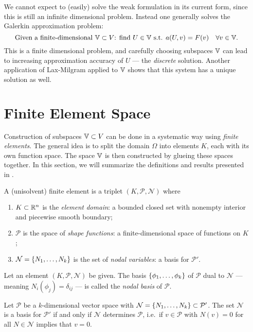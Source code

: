 \documentclass[thesis.tex]{subfiles}
\begin{document}
We cannot expect to (easily) solve the weak formulation in its current form, since this is still an infinite dimensional problem.
Instead one generally solves the Galerkin approximation problem:
\begin{equation}
  \label{eq:galerk_finite}
  \text{Given a finite-dimensional } \mathbb{V} \subset V \text{: find $U \in \mathbb{V}$ s.t. } a(U, v) = F(v) \quad \forall v \in \mathbb{V}.
\end{equation}
This is a finite dimensional problem, and carefully choosing subspaces $\mathbb{V}$ can lead to increasing approximation accuracy of $U$ --- 
the \emph{discrete} solution. Another application of Lax-Milgram applied to $\mathbb{V}$ shows that this system has a unique solution as well.



\section{Finite Element Space}
  \label{sec:deffem}
  Construction of subspaces $\mathbb{V} \subset V$ can be done in a systematic way using \emph{finite elements}. 
  The general idea is to split the domain $\Omega$ into elements $K$, each with its own function space.
  The space $\mathbb{V}$ is then constructed by glueing these spaces together. In this section, we will summarize the definitions and results
  presented in \cite[Ch~3]{brenner}.
  \begin{defn} 
    A (unisolvent) finite element is a triplet $(K, \mathcal{P}, \mathcal{N})$ where
    \begin{enumerate}[label=(\alph*)]
      \item $K \subset \mathbb{R}^n$ is the \emph{element domain}: a bounded closed set with nonempty interior and piecewise smooth boundary;
    \item $\mathcal{P}$ is the space of \emph{shape functions}: a finite-dimensional space of functions on $K$;
  \item $\mathcal{N} = \set{N_1, \dots, N_k}$ is the set of \emph{nodal variables}: a basis for $\mathcal{P}'$.
    \end{enumerate}
  \end{defn}
  \begin{defn}
    \label{def:dualbasis}
    Let an element $(K, \mathcal{P}, \mathcal{N})$ be given. The basis $\set{\phi_1, \dots, \phi_k}$ of $\mathcal{P}$ dual to $\mathcal{N}$ --- meaning $N_i(\phi_j) = \delta_{ij}$ --- is called the \emph{nodal basis} of $\mathcal{P}$.
  \end{defn}
  \begin{lem}
    Let $\mathcal{P}$ be a $k$-dimensional vector space with $\mathcal{N} = \set{N_1, \dots, N_k} \subset \mathcal{P}'$.
    The set $\mathcal{N}$ is a basis for $\mathcal{P}'$ if and only if $\mathcal{N}$ determines $\mathcal{P}$, i.e.~if $v \in \mathcal{P}$ with $N(v) = 0$ for all $N \in \mathcal{N}$ implies that $v = 0$.
  \end{lem}
\end{document}
